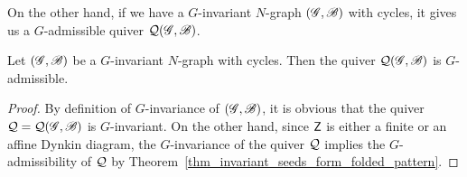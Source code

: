 On the other hand, if we have a $G$-invariant $N$-graph $(\mathscr{G}, \mathscr{B})$ with cycles, it gives us a $G$-admissible quiver $\mathcal{Q}(\mathscr{G}, \mathscr{B})$.
\begin{lemma}\label{lemma:G-invariant Ngraphs imply G-admissible quivers}
Let $(\mathscr{G}, \mathscr{B})$ be a $G$-invariant $N$-graph with cycles.
Then the quiver $\mathcal{Q}(\mathscr{G}, \mathscr{B})$ is $G$-admissible.
\end{lemma}
\begin{proof}
By definition of $G$-invariance of $(\mathscr{G}, \mathscr{B})$, it is obvious that the quiver $\mathcal{Q}=\mathcal{Q}(\mathscr{G}, \mathscr{B})$ is $G$-invariant.
On the other hand, since $\mathsf{Z}$ is either a finite or an affine Dynkin diagram, the $G$-invariance of the quiver $\mathcal{Q}$ implies the $G$-admissibility of $\mathcal{Q}$  by Theorem~\ref{thm_invariant_seeds_form_folded_pattern}.
\end{proof}

